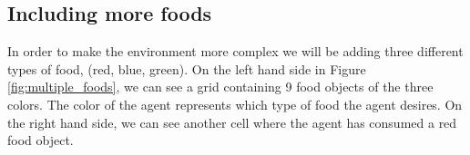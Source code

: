 \documentclass[12pt,A4]{report}
\theoremstyle{definition}
\begin{document}

\subsection{Including more foods}
In order to make the environment more complex we will be adding three different types of food, (red, blue, green). On the left hand side in Figure \ref{fig:multiple_foods}, we can see a grid containing 9 food objects of the three colors. The color of the agent represents which type of food the agent desires. On the right hand side, we can see another cell where the agent has consumed a red food object. 
\end{document}
